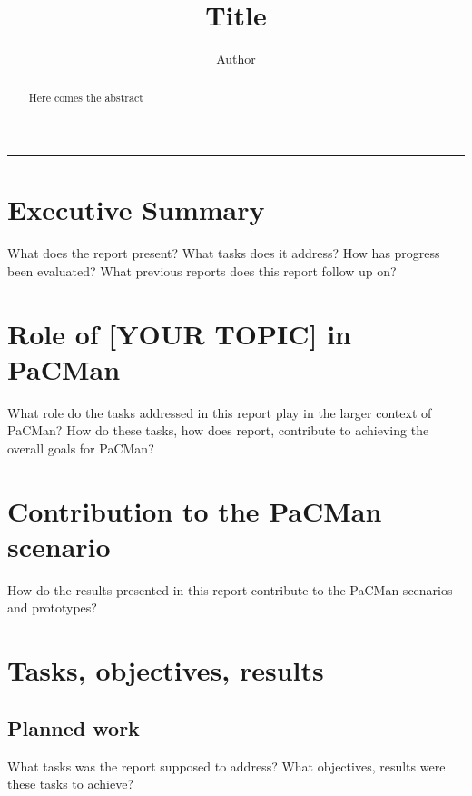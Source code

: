 \documentclass[a4paper,11pt,pdf]{pacmanreport}
\title{Title}
\author{Author}
\begin{document}
\maketitle

\begin{abstract}
\noindent Here comes the abstract
\end{abstract}


\vspace{.2em}
\hrule

\footnotesize

\tableofcontents

\normalsize

\newpage

\section*{Executive Summary}

What does the report present? What tasks does it address? How has progress been evaluated? What previous reports does this report follow up on? 

\section*{Role of [YOUR TOPIC] in PaCMan}

What role do the tasks addressed in this report play in the larger context of PaCMan? How do these tasks, how does report, contribute to achieving the overall goals for PaCMan? 

\section*{Contribution to the PaCMan scenario}

How do the results presented in this report contribute to the PaCMan scenarios and prototypes? 


\newpage

\section{Tasks, objectives, results}

\subsection{Planned work}

What tasks was the report supposed to address? What objectives, results were these tasks to achieve? 
\end{document}
